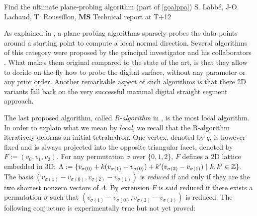 

   {Find the ultimate plane-probing algorithm (part of \ref{goalppa})}
   {S. Labb\'{e}, J-O. Lachaud, T. Roussillon, \textbf{MS}}
   {Technical report at T+12}
\medskip

As explained in , a plane-probing algorithms sparsely
probes the data points around a starting point to compute a local
normal direction. Several algorithms of this category were proposed by
the principal investigator and his collaborators \cite{LPRTCS2016,
  LPRDGCI2016, LPRJMIV2017}.  What makes them original compared to the
state of the art, is that they allow to decide on-the-fly how to probe
the digital surface, without any parameter or any prior order. Another
remarkable aspect of such algorithms is that there 2D variants fall
back on the very successful maximal digital straight segment approach.

The last proposed algorithm, called \emph{R-algorithm} in \cite{LPRJMIV2017}, is the most
local algorithm. In order to explain what we mean by \emph{local}, we recall that
the R-algorithm iteratively deforms an initial tetrahedron. One vertex, denoted by $q$,
is however fixed and is always projected into the opposite triangular facet, denoted by
$F := (v_0,v_1,v_2)$. For any permutation $\sigma$ over $\{0,1,2\}$, $F$ defines a 2D
lattice embedded in 3D:
$\Lambda := \{ v_{\sigma(0)} + k (v_{\sigma(1)}-v_{\sigma(0)}) + k' (v_{\sigma(2)}-v_{\sigma(1)}) \ | \ k,k' \in {\ensuremath\mathbb{Z}} \}$. 
The basis $(v_{\sigma(1)}-v_{\sigma(0)}, v_{\sigma(2)}-v_{\sigma(1)})$ is \emph{reduced} if and only
if they are the two shortest nonzero vectors of $\Lambda$. By extension $F$ is said reduced
if there exists a permutation $\sigma$ such that $(v_{\sigma(1)}-v_{\sigma(0)}, v_{\sigma(2)}-v_{\sigma(1)})$
is reduced. The following conjucture is experimentally true but not yet proved:

